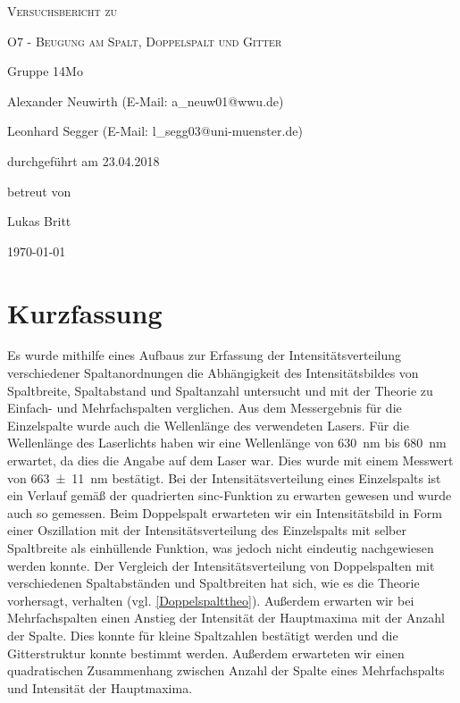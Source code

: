 \documentclass[
	a4paper,
	12pt,
	pagesize,
	ngerman
]{scrartcl}
\begin{document}
	
	\begin{titlepage}
		\centering
		{\scshape\LARGE Versuchsbericht zu \par}
		\vspace{1cm}
		{\scshape\huge O7 - Beugung am Spalt, Doppelspalt und Gitter \par}
		\vspace{2.5cm}
		{\LARGE Gruppe 14Mo \par}
		\vspace{0.5cm}
		
		{\large Alexander Neuwirth (E-Mail: a\_neuw01@wwu.de) \par}
		{\large Leonhard Segger (E-Mail: l\_segg03@uni-muenster.de) \par}
		\vfill
		
		durchgeführt am 23.04.2018\par
		betreut von\par
		{\large Lukas Britt}
		
		\vfill
		
		{\large \today\par}
	\end{titlepage}
	\tableofcontents
	\newpage

	\section{Kurzfassung}
	
	Es wurde mithilfe eines Aufbaus zur Erfassung der Intensitätsverteilung verschiedener Spaltanordnungen die Abhängigkeit des Intensitätsbildes von Spaltbreite, Spaltabstand und Spaltanzahl untersucht und mit der Theorie zu Einfach- und Mehrfachspalten verglichen.
	Aus dem Messergebnis für die Einzelspalte wurde auch die Wellenlänge des verwendeten Lasers.
	Für die Wellenlänge des Laserlichts haben wir eine Wellenlänge von \SI{630}{\nano \meter} bis \SI{680}{\nano \meter} erwartet, da dies die Angabe auf dem Laser war.
	Dies wurde mit einem Messwert von \SI{663 \pm 11}{nm} bestätigt.
	Bei der Intensitätsverteilung eines Einzelspalts ist ein Verlauf gemäß der quadrierten sinc-Funktion zu erwarten gewesen und wurde auch so gemessen.
	Beim Doppelspalt erwarteten wir ein Intensitätsbild in Form einer Oszillation mit der Intensitätsverteilung des Einzelspalts mit selber Spaltbreite als einhüllende Funktion, was jedoch nicht eindeutig nachgewiesen werden konnte.
	Der Vergleich der Intensitätsverteilung von Doppelspalten mit verschiedenen Spaltabständen und Spaltbreiten hat sich, wie es die Theorie vorhersagt, verhalten (vgl. \cref{Doppelspalttheo}). 
	Außerdem erwarten wir bei Mehrfachspalten einen Anstieg der Intensität der Hauptmaxima mit der Anzahl der Spalte.
	Dies konnte für kleine Spaltzahlen bestätigt werden und die Gitterstruktur konnte bestimmt werden.
	Außerdem erwarteten wir einen quadratischen Zusammenhang zwischen Anzahl der Spalte eines Mehrfachspalts und Intensität der Hauptmaxima.
	
\end{document}
